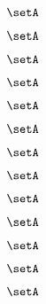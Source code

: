 \begin{forslides}
    \begin{equation}
        \label{eq:slides-processes-61}
        \setA
    \end{equation}

    \begin{equation}
        \label{eq:slides-processes-62}
        \setA
    \end{equation}

    \begin{equation}
        \label{eq:slides-processes-63}
        \setA
    \end{equation}

    \begin{equation}
        \label{eq:slides-processes-64}
        \setA
    \end{equation}

    \begin{equation}
        \label{eq:slides-processes-65}
        \setA
    \end{equation}

    \begin{equation}
        \label{eq:slides-processes-66}
        \setA
    \end{equation}

    \begin{equation}
        \label{eq:slides-processes-67}
        \setA
    \end{equation}

    \begin{equation}
        \label{eq:slides-processes-68}
        \setA
    \end{equation}

    \begin{equation}
        \label{eq:slides-processes-69}
        \setA
    \end{equation}
    
    \begin{equation}
        \label{eq:slides-processes-70}
        \setA
    \end{equation}

    \begin{equation}
        \label{eq:slides-processes-71}
        \setA
    \end{equation}

    \begin{equation}
        \label{eq:slides-processes-72}
        \setA
    \end{equation}

    \begin{equation}
        \label{eq:slides-processes-73}
        \setA
    \end{equation}


\end{forslides}
